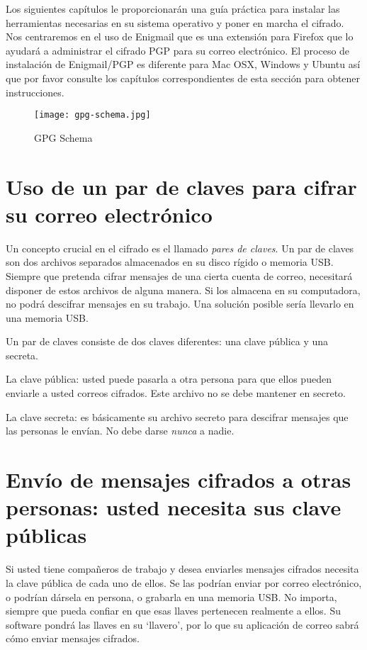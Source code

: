 \documentclass[10pt,a5paper,twoside,,]{book}
\begin{document}
Los siguientes capítulos le proporcionarán una guía práctica para
instalar las herramientas necesarias en su sistema operativo y poner en
marcha el cifrado. Nos centraremos en el uso de Enigmail que es una
extensión para Firefox que lo ayudará a administrar el cifrado PGP para
su correo electrónico. El proceso de instalación de Enigmail/PGP es
diferente para Mac OSX, Windows y Ubuntu así que por favor consulte los
capítulos correspondientes de esta sección para obtener instrucciones.

\begin{figure}[htbp]
\centering
\texttt{[image: gpg-schema.jpg]}
\caption{GPG Schema}
\end{figure}

\section{Uso de un par de claves para cifrar su correo
electrónico}\label{uso-de-un-par-de-claves-para-cifrar-su-correo-electruxf3nico}

Un concepto crucial en el cifrado es el llamado \emph{pares de claves}.
Un par de claves son dos archivos separados almacenados en su disco
rígido o memoria USB. Siempre que pretenda cifrar mensajes de una cierta
cuenta de correo, necesitará disponer de estos archivos de alguna
manera. Si los almacena en su computadora, no podrá descifrar mensajes
en su trabajo. Una solución posible sería llevarlo en una memoria USB.

Un par de claves consiste de dos claves diferentes: una clave pública y
una secreta.

La clave pública: usted puede pasarla a otra persona para que ellos
pueden enviarle a usted correos cifrados. Este archivo no se debe
mantener en secreto.

La clave secreta: es básicamente su archivo secreto para descifrar
mensajes que las personas le envían. No debe darse \emph{nunca} a nadie.

\section{Envío de mensajes cifrados a otras personas: usted necesita sus
clave
públicas}\label{envuxedo-de-mensajes-cifrados-a-otras-personas-usted-necesita-sus-clave-puxfablicas}

Si usted tiene compañeros de trabajo y desea enviarles mensajes cifrados
necesita la clave pública de cada uno de ellos. Se las podrían enviar
por correo electrónico, o podrían dársela en persona, o grabarla en una
memoria USB. No importa, siempre que pueda confiar en que esas llaves
pertenecen realmente a ellos. Su software pondrá las llaves en su
`llavero', por lo que su aplicación de correo sabrá cómo enviar mensajes
cifrados.
\end{document}
